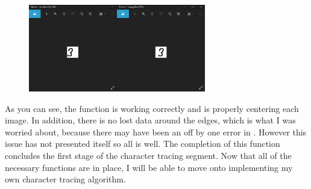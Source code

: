 \documentclass{report}
\begin{document}
\begin{figure}[H]
    \centering
    \includegraphics[height=1.5in]{Images/Development and Testing/Stage 4/Centre Image/Real Test Image - Test.png}
    \label{fig:Test-Real Image Case}
\end{figure}
\noindent As you can see, the function is working correctly and is properly centering each image. In addition, there is no lost data around the edges, which is what I was worried about, because there may have been an off by one error in . However this issue has not presented itself so all is well.
\newline
The completion of this function concludes the first stage of the character tracing segment. Now that all of the necessary functions are in place, I will be able to move onto implementing my own character tracing algorithm.
\newpage
\end{document}
